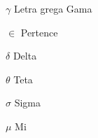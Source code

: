 



\begin{simbolos}
  \item[$ \gamma $] Letra grega Gama
  \item[$ \in $] Pertence
  \item[$ \delta$] Delta
  \item[$ \theta$] Teta
  \item[$ \sigma$] Sigma
  \item[$ \mu$] Mi
  
\end{simbolos}


